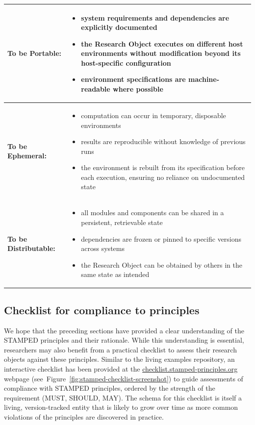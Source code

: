 \documentclass{article}
\makeatletter
\newcommand{\hyanchor}[1]{\texorpdfstring{\Hy@raisedlink{\hypertarget{#1}{}}}{}}
\newcommand{\httpsurl}[1]{\href{https://#1}{#1}}
\newcommand{\anchoredsubsection}[2]{\subsection[#2]{\hyanchor{#1}#2}}
\makeatother
\begin{document}
\begin{table}[htbp]
\begin{tabular}{|l|p{}|}
\hline
\textbf{To be Portable:} &
\begin{itemize}[noitemsep,topsep=0pt,leftmargin=*]
  \item system requirements and dependencies are explicitly documented
  \item the Research Object executes on different host environments without modification beyond its host-specific configuration
  \item environment specifications are machine-readable where possible
\end{itemize} \\
\hline
\textbf{To be Ephemeral:} &
\begin{itemize}[noitemsep,topsep=0pt,leftmargin=*]
  \item computation can occur in temporary, disposable environments
  \item results are reproducible without knowledge of previous runs
  \item the environment is rebuilt from its specification before each execution, ensuring no reliance on undocumented state
\end{itemize} \\
\hline
\textbf{To be Distributable:} &
\begin{itemize}[noitemsep,topsep=0pt,leftmargin=*]
  \item all modules and components can be shared in a persistent, retrievable state
  \item dependencies are frozen or pinned to specific versions across systems
  \item the Research Object can be obtained by others in the same state as intended
\end{itemize} \\
\hline
\end{tabular}
\label{tab:stamped-principles}
\end{table}





\anchoredsubsection{checklist}{Checklist for compliance to principles}

We hope that the preceding sections have provided a clear understanding of the STAMPED principles and their rationale.
While this understanding is essential, researchers may also benefit from a practical checklist to assess their research objects against these principles.
Similar to the living examples repository, an interactive checklist has been provided at the \httpsurl{checklist.stamped-principles.org} webpage (see~Figure~\ref{fig:stamped-checklist-screenshot}) to guide assessments of compliance with STAMPED principles, ordered by the strength of the requirement (MUST, SHOULD, MAY).
The schema for this checklist is itself a living, version-tracked entity\cite{cody_baker_stamped-principlesstamped-checklist-schema_2026} that is likely to grow over time as more common violations of the principles are discovered in practice.
\end{document}
